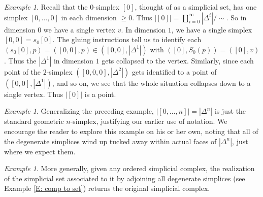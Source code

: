 \documentclass[12pt]{article}
\theoremstyle{plain}
\theoremstyle{definition}
\theoremstyle{remark}
\newtheorem{example}[theorem]{Example}
\begin{document}
\begin{example}\label{E: 0}
Recall that the $0$-simplex $[0]$, thought of as a simplicial set, has one simplex $[0,\ldots,0]$ in each dimension $\geq 0$. Thus $|[0]|=\coprod_{i=0}^\infty |\Delta^i|/\sim$. So in dimension $0$ we have a single vertex $v$. In dimension $1$, we have a single simplex $[0,0]=s_0[0]$. The gluing instructions tell us to identify each $(s_0[0],p)=([0,0],p)\in ([0,0],|\Delta^1|)$
with $([0],S_0(p))=([0],v)$. Thus the $|\Delta^1|$ in dimension $1$ gets collapsed to the vertex. Similarly, since each point of the $2$-simplex $([0,0,0],|\Delta^2|)$ gets identified to a point of $([0,0],|\Delta^1|)$, and so on, we see that the whole situation collapses down to a single vertex. Thus $|[0]|$ is a point.
\end{example}

\begin{example}
Generalizing the preceding example, $|[0,\ldots, n]|=|\Delta^n|$ is just the standard geometric $n$-simplex, justifying our earlier use of notation.  We encourage the reader to explore this example on his or her own, noting that all of the degenerate simplices wind up tucked away within actual faces of $|\Delta^n|$, just where we expect them.
\end{example}

\begin{example}\label{E: return}
More generally, given any ordered simplicial complex, the realization of the simplicial set associated to it by adjoining all degenerate simplices (see Example \ref{E: comp to set}) returns the original simplicial complex.
\end{example}
\end{document}

